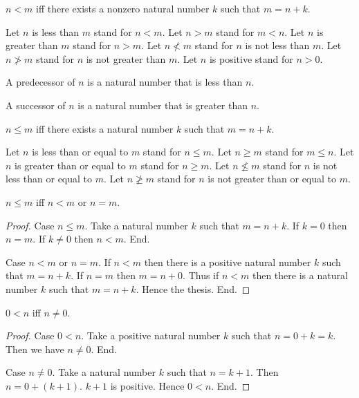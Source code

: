 \documentclass[../../arithmetic.ftl.tex]{subfiles}
\begin{document}
  \begin{forthel}

    \begin{definition}
      $n < m$ iff there exists a nonzero natural number $k$ such that $m = n + k$.
    \end{definition}

    Let $n$ is less than $m$ stand for $n < m$.
    Let $n > m$ stand for $m < n$.
    Let $n$ is greater than $m$ stand for $n > m$.
    Let $n \nless m$ stand for $n$ is not less than $m$.
    Let $n \ngtr m$ stand for $n$ is not greater than $m$.
    Let $n$ is positive stand for $n > 0$.

    \begin{definition}
      A predecessor of $n$ is a natural number that is less than $n$.
    \end{definition}

    \begin{definition}
      A successor of $n$ is a natural number that is greater than $n$.
    \end{definition}

    \begin{definition}
      $n \leq m$ iff there exists a natural number $k$ such that $m = n + k$.
    \end{definition}

    Let $n$ is less than or equal to $m$ stand for $n \leq m$.
    Let $n \geq m$ stand for $m \leq n$.
    Let $n$ is greater than or equal to $m$ stand for $n \geq m$.
    Let $n \nleq m$ stand for $n$ is not less than or equal to $m$.
    Let $n \ngeq m$ stand for $n$ is not greater than or equal to $m$.

    \begin{proposition}\label{Arithmetic_02_01_206749}
      $n \leq m$ iff $n < m$ or $n = m$.
    \end{proposition}
    \begin{proof}
      Case $n \leq m$.
        Take a natural number $k$ such that $m = n + k$.
        If $k = 0$ then $n = m$. If $k \neq 0$ then $n < m$.
      End.

      Case $n < m$ or $n = m$.
        If $n < m$ then there is a positive natural number $k$ such that $m = n + k$.
        If $n = m$ then $m = n + 0$.
        Thus if $n < m$ then there is a natural number $k$ such that $m = n + k$.
        Hence the thesis.
      End.
    \end{proof}


    \begin{proposition}\label{Arithmetic_02_01_115117}
      $0 < n$ iff $n \neq 0$.
    \end{proposition}
    \begin{proof}
      Case $0 < n$.
        Take a positive natural number $k$ such that $n = 0 + k = k$.
        Then we have $n \neq 0$.
      End.

      Case $n \neq 0$.
        Take a natural number $k$ such that $n = k + 1$.
        Then $n = 0 + (k + 1)$.
        $k + 1$ is positive.
        Hence $0 < n$.
      End.
    \end{proof}
  \end{forthel}
\end{document}
